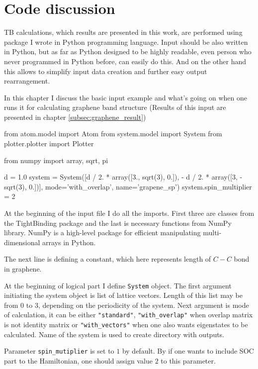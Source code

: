 \chapter{Code discussion}
TB calculations, which results are presented in this work, are performed using package I wrote in Python programming language. Input should be also written in Python, but as far as Python designed to be highly readable, even person who never programmed in Python before, can easily do this. And on the other hand this allows to simplify input data creation and further easy output rearrangement.

In this chapter I discuss the basic input example and what's going on when one runs it for calculating graphene band structure (Results of this input are presented in chapter \ref{subsec:graphene_result})

\begin{python}
from atom.model import Atom
from system.model import System
from plotter.plotter import Plotter

from numpy import array, sqrt, pi

d = 1.0
system = System([d / 2. * array([3., sqrt(3), 0.]),
                 - d / 2. * array([3, -sqrt(3), 0.])],
                mode='with_overlap', name='grapene_sp')
system.spin_multiplier = 2
\end{python}
 
At the beginning of the input file I do all the imports. First three are classes from the TightBinding package and the last is necessary functions from NumPy library. NumPy is a high-level package for efficient manipulating multi-dimensional arrays in Python. 

The next line is defining a constant, which here represents length of $C-C$ bond in graphene.

At the beginning of logical part I define \verb!System! object. The first argument initiating the system object is list of lattice vectors. Length of this list may be from $0$ to $3$, depending on the periodicity of the system. Next argument is mode of calculation, it can be either \verb!"standard"!, \verb!"with_overlap"! when overlap matrix is not identity matrix or \verb!"with_vectors"! when one also wants eigenstates to be calculated. Name of the system is used to create directory with outputs.

Parameter \verb!spin_mutiplier! is set to $1$ by default. By if one wants to include SOC part to the Hamiltonian, one should assign value $2$ to this parameter.

